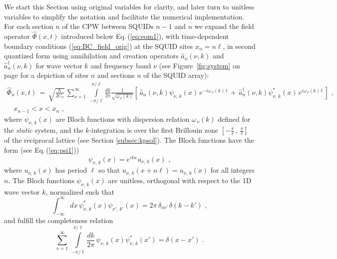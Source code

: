 \noindent
We start this Section using original variables for clarity, and later turn to unitless variables to 
simplify the notation and facilitate the numerical implementation. 
For each section $n$ of the CPW between SQUIDs $n-1$ and $n$ we expand the field operator $\hat{\Phi}(x,t)$
introduced below Eq.\,(\ref{eq:eom1}), with time-dependent 
boundary conditions (\ref{eq:BC_field_orig}) at the SQUID sites 
$x_n = n \ell$, in second quantized form using annihilation and creation operators $\hat{a}_n(\nu,k)$ and 
${\hat a}_n^\dagger(\nu,k)$ for wave vector $k$ and frequency band $\nu$
(see Figure \,\ref{fig:system} on page \pageref{fig:system} for a depiction of 
sites $n$ and sections $n$ of the SQUID array):  
%
\begin{equation} \label{eq:flux_field_orig}
\begin{split}
    \hat{\Phi}_n(x,t) \, = \, \sqrt{\frac{\hbar}{2 C_0}} \, \sum_{\nu=1}^{\infty} \, 
    \int\limits_{-\pi/\ell}^{\pi/\ell}\frac{dk}{2 \pi} \frac{1}{\sqrt{\omega_{\,\nu}(k)}}
    \left[ \, \hat{a}_n(\nu,k) \psi_{\nu,\,k}(x) \, e^{-i \omega_{\,\nu}(k) \, t} \, + \, 
    \hat{a}_n^{\dagger}(\nu,k) \psi_{\nu,\,k}^*(x) \, e^{i \omega_{\,\nu}(k) \, t} \, \right] \, \, , \\
    \quad x_{n-1} < x < x_n \, \, ,
\end{split}
\end{equation}
%
where $\psi_{\nu,\,k}(x)$ are Bloch functions with dispersion relation $\omega_{\,\nu}(k)$ defined for 
the {\em static} system, 
and the $k$-integration is over the first Brillouin zone 
$\displaystyle{\left[-\frac{\pi}{\ell}\, , \, \frac{\pi}{\ell} \right]}$
of the reciprocal lattice (see Section \ref{subsec:kpsol}). The Bloch functions have the form (see Eq.\,(\ref{eq:psi1})) 
%
\begin{equation} \label{eq:psi2}
\psi_{\nu,\,k}(x) = e^{i k x} u_{\nu,\,k}(x) \, \, ,
\end{equation}
%
where $u_{\nu,\,k}(x)$ has period $\ell$ so that $u_{\nu,\,k}(x + n \ell) = u_{\nu,\,k}(x)$
for all integers $n$.
The Bloch functions $\psi_{\nu,\,k}(x)$ are unitless, orthogonal with respect to 
the 1D wave vector $k$, normalized such that
%
\begin{equation} \label{eq:psi1_norm_orig2}
\int_{-\infty}^{\infty} dx \, \psi^*_{\nu,\,k}(x) \psi_{\nu',\,k'}(x) = 2 \pi \, \delta_{\nu \nu'} \, \delta(k - k') \, \, ,
\end{equation}
%
and fulfill the completeness relation
%
\begin{equation} \label{eq:psi1_comp_orig}
\sum_{\nu=1}^{\infty} \, 
\int\limits_{-\pi/\ell}^{\pi/\ell}\frac{dk}{2 \pi} \, 
\psi_{\nu,\,k}(x) \psi^*_{\nu,\,k}(x') = \delta(x-x') \, \, .
\end{equation}
